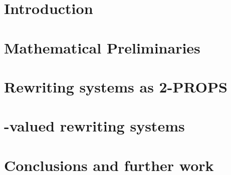 \documentclass[a4paper]{article}
\begin{document}
\maketitle



\section{Introduction}
\label{sec:intro}

\section{Mathematical Preliminaries}
\label{sec:prelim}

\section{Rewriting systems as 2-PROPS}
\label{sec:rewriting}

\section{-valued rewriting systems}

\section{Conclusions and further work}
\label{sec:conclusion}



\small

\end{document}
